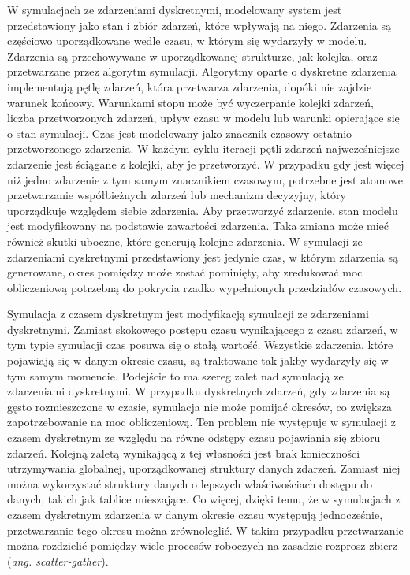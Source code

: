 W symulacjach ze zdarzeniami dyskretnymi, modelowany system jest przedstawiony jako stan i zbiór zdarzeń, które wpływają na niego. Zdarzenia są częściowo uporządkowane wedle czasu, w którym się wydarzyły w modelu. Zdarzenia są przechowywane w uporządkowanej strukturze, jak kolejka, oraz przetwarzane przez algorytm symulacji. Algorytmy oparte o dyskretne zdarzenia implementują pętlę zdarzeń, która przetwarza zdarzenia, dopóki nie zajdzie warunek końcowy. Warunkami stopu może być wyczerpanie kolejki zdarzeń, liczba przetworzonych zdarzeń, upływ czasu w modelu lub warunki opierające się o stan symulacji. Czas jest modelowany jako znacznik czasowy ostatnio przetworzonego zdarzenia. W każdym cyklu iteracji pętli zdarzeń najwcześniejsze zdarzenie jest ściągane z kolejki, aby je przetworzyć. W przypadku gdy jest więcej niż jedno zdarzenie z tym samym znacznikiem czasowym, potrzebne jest atomowe przetwarzanie współbieżnych zdarzeń lub mechanizm decyzyjny, który uporządkuje względem siebie zdarzenia. Aby przetworzyć zdarzenie, stan modelu jest modyfikowany na podstawie zawartości zdarzenia. Taka zmiana może mieć również skutki uboczne, które generują kolejne zdarzenia. W symulacji ze zdarzeniami dyskretnymi przedstawiony jest jedynie czas, w którym zdarzenia są generowane, okres pomiędzy może zostać pominięty, aby zredukować moc obliczeniową potrzebną do pokrycia rzadko wypełnionych przedziałów czasowych.

Symulacja z czasem dyskretnym jest modyfikacją symulacji ze zdarzeniami dyskretnymi. Zamiast skokowego postępu czasu wynikającego z czasu zdarzeń, w tym typie symulacji czas posuwa się o stałą wartość. Wszystkie zdarzenia, które pojawiają się w danym okresie czasu, są traktowane tak jakby wydarzyły się w tym samym momencie. Podejście to ma szereg zalet nad symulacją ze zdarzeniami dyskretnymi. W przypadku dyskretnych zdarzeń, gdy zdarzenia są gęsto rozmieszczone w czasie, symulacja nie może pomijać okresów, co zwiększa zapotrzebowanie na moc obliczeniową. Ten problem nie występuje w symulacji z czasem dyskretnym ze względu na równe odstępy czasu pojawiania się zbioru zdarzeń. Kolejną zaletą wynikającą z tej własności jest brak konieczności utrzymywania globalnej, uporządkowanej struktury danych zdarzeń. Zamiast niej można wykorzystać struktury danych o lepszych właściwościach dostępu do danych, takich jak tablice mieszające. Co więcej, dzięki temu, że w symulacjach z czasem dyskretnym zdarzenia w danym okresie czasu występują jednocześnie, przetwarzanie tego okresu można zrównoleglić. W takim przypadku przetwarzanie można rozdzielić pomiędzy wiele procesów roboczych na zasadzie rozprosz-zbierz (\emph{ang. scatter-gather}).


